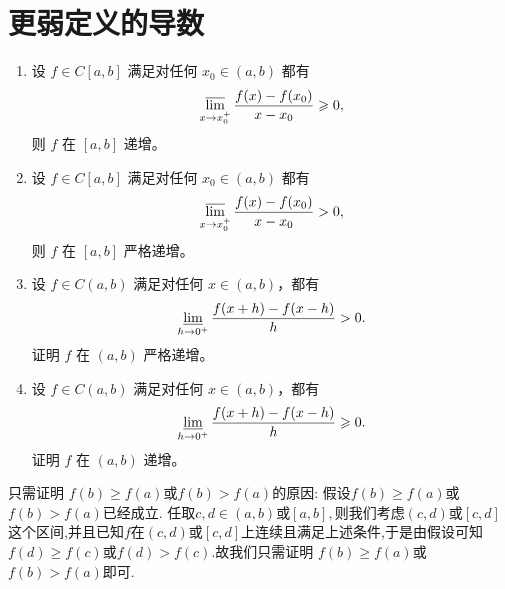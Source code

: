 \documentclass[../../main.tex]{subfiles}%
\begin{document}
\section{更弱定义的导数}

\begin{theorem}[最弱递增条件]\label{theorem:最弱递增条件}
\begin{enumerate}
\item 设 \(f\in C[a,b]\) 满足对任何 \(x_0\in (a,b)\) 都有
\begin{align*}
\varlimsup_{x\rightarrow x_0^+}\frac{f(x)-f(x_0)}{x - x_0}\geqslant 0,
\end{align*}
则 \(f\) 在 \([a,b]\) 递增。

\item 设 \(f\in C[a,b]\) 满足对任何 \(x_0\in (a,b)\) 都有
\begin{align}
\varlimsup_{x\rightarrow x_0^+}\frac{f(x)-f(x_0)}{x - x_0}> 0,\label{equation--13.100}
\end{align}
则 \(f\) 在 \([a,b]\) 严格递增。

\item 设 \(f\in C(a,b)\) 满足对任何 \(x\in (a,b)\)，都有
\begin{align*}
\varliminf_{h\rightarrow 0^+}\frac{f(x + h)-f(x - h)}{h}> 0.
\end{align*}
证明 \(f\) 在 \((a,b)\) 严格递增。

\item 设 \(f\in C(a,b)\) 满足对任何 \(x\in (a,b)\)，都有
\begin{align*}
\varliminf_{h\rightarrow 0^+}\frac{f(x + h)-f(x - h)}{h}\geqslant 0.
\end{align*}
证明 \(f\) 在 \((a,b)\) 递增。 
\end{enumerate}
\end{theorem}
\begin{remark}
只需证明 \(f(b) \geqslant  f(a)\)或\(f(b)>f(a)\)的原因:
假设\(f(b) \geqslant  f(a)\)或\(f(b)>f(a)\)已经成立.
任取$c,d\in (a,b)$或$[a,b],$则我们考虑$(c,d)$或$[c,d]$这个区间,并且已知$f$在$(c,d)$或$[c,d]$上连续且满足上述条件,于是由假设可知\(f(d) \geqslant  f(c)\)或\(f(d)>f(c)\).故我们只需证明 \(f(b) \geqslant  f(a)\)或\(f(b)>f(a)\)即可.
\end{remark}
\end{document}
